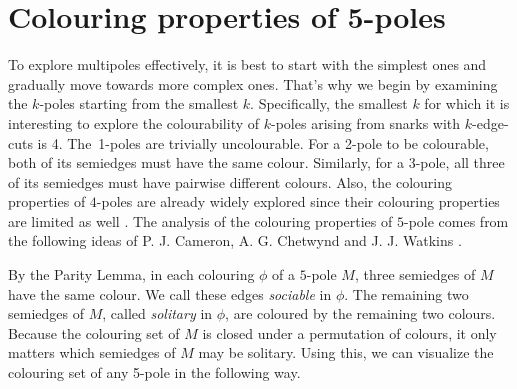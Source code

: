 \section{Colouring properties of 5-poles}

To explore multipoles effectively, it is best to start with the simplest ones and gradually move towards more complex ones. That's why we begin by examining the $k$-poles starting from the smallest $k$. Specifically, the smallest $k$ for which it is interesting to explore the colourability of $k$-poles arising from snarks with $k$-edge-cuts is 4.
The~1-poles are trivially uncolourable.
For a 2-pole to be colourable, both of its semiedges must have the same colour.
Similarly, for a 3-pole, all three of its semiedges must have pairwise different colours. Also, the colouring properties of $4$-poles are already widely explored since their colouring properties are limited as well \cite{ChladnyFactorisation}.
The analysis of the colouring properties of $5$-pole comes from the following ideas of P. J. Cameron, A. G. Chetwynd and J. J. Watkins \cite{Cameron1987}.

By the Parity Lemma, in each colouring $\phi$ of a $5$-pole $M$, three semiedges of $M$ have the same colour. We call these edges \textit{sociable} in $\phi$. The remaining two semiedges of $M$, called \emph{solitary} in $\phi$, are coloured by the remaining two colours.
Because the colouring set of $M$ is closed under a permutation of colours, it only matters which semiedges of $M$ may be solitary. Using this, we can visualize the colouring set of any 5-pole in the following way.

